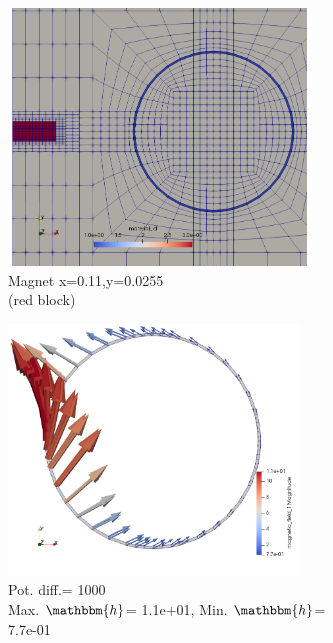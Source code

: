 \documentclass[11pt,a4paper,final]{article}
\begin{document}
\begin{figure}[h]
\centering
\begin{subfigure}{0.32\textwidth}
\centering
\includegraphics[width=0.87\textwidth]{magnet_x_p.png}
\caption{\scriptsize Magnet x=0.11,y=0.0255 \\(red block)}
\label{fig:1.5.1}
\end{subfigure}
\begin{subfigure}{0.33\textwidth}
\centering
\includegraphics[width=0.85\textwidth]{x_p.png}
\caption{\scriptsize Pot. diff.= 1000 \\ Max. $\mathbbm{h}$= 1.1e+01, Min. $\mathbbm{h}$= 7.7e-01}
\label{fig:1.5.2}
\end{subfigure}
\begin{subfigure}{0.33\textwidth}

\end{subfigure}
\end{figure}
\end{document}
